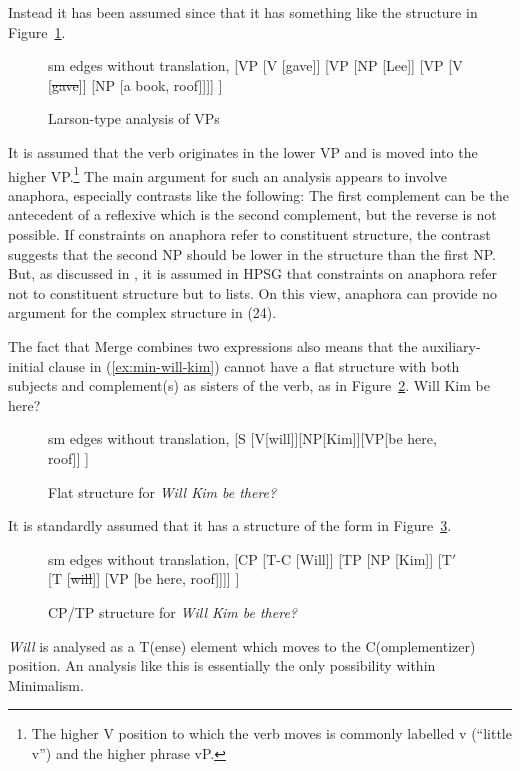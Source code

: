 \documentclass[output=paper]{langsci/langscibook}
\begin{document}
\noindent 
Instead it has been assumed since \citet{Larson88a} that it has something like the
structure in Figure~\ref{fig:gave-lee-book-Larson}.
\begin{figure}
	\centering
	\begin{forest} sm edges without translation, 
		[VP
		[V [gave]]
		[VP [NP [Lee]] [VP [V [\sout{gave}]] [NP [a book, roof]]]]
		]
	\end{forest}
	\caption{\label{fig:gave-lee-book-Larson}Larson-type analysis of VPs}
\end{figure}
It is assumed that the verb originates in the lower VP and is moved into the higher VP.\footnote{%
The higher V position to which the verb moves is commonly labelled v (``little v'') and the higher phrase vP.%
}
The main argument for such an analysis appears to involve anaphora, especially contrasts like the following:
\eal\label{ex:min-john-showed}
\zl 
The first complement can be the antecedent of a reflexive which is the second complement, but the
reverse is not possible. If constraints on anaphora refer to constituent structure, the contrast
suggests that the second NP should be lower in the structure than the first NP. But, as discussed in
, it is assumed in HPSG that constraints on anaphora refer not
to constituent structure but to \argst lists. On this view, anaphora can provide no argument for the
complex structure in (24).

The fact that Merge combines two expressions also means that the auxiliary-initial clause in (\ref{ex:min-will-kim}) cannot have a flat structure with both subjects and complement(s) as sisters of the verb, as in Figure~\ref{fig:will-kim}.
\ea
Will Kim be here?\label{ex:min-will-kim}
\z
\begin{figure}
	\centering
	\begin{forest} sm edges without translation, 
		[S
		[V[will]][NP[Kim]][VP[be here, roof]]
		]
	\end{forest}
	\caption{\label{fig:will-kim}Flat structure for \emph{Will Kim be there?}}
\end{figure}
It is standardly assumed that it has a structure of the form in Figure~\ref{fig:will-kim-b}.
%
\begin{figure}
	\centering
	\begin{forest} sm edges without translation, 
		[CP
		[T-C [Will]] 
		[TP [NP [Kim]]
			[T$'$ [T [\sout{will}]]
			[VP [be here, roof]]]]
		]
	\end{forest}
	\caption{\label{fig:will-kim-b}CP/TP structure for \emph{Will Kim be there?}}
\end{figure}
%
\textit{Will} is analysed as a T(ense) element which moves to the C(omplementizer) position. An
analysis like this is essentially the only possibility within Minimalism. 
\end{document}
